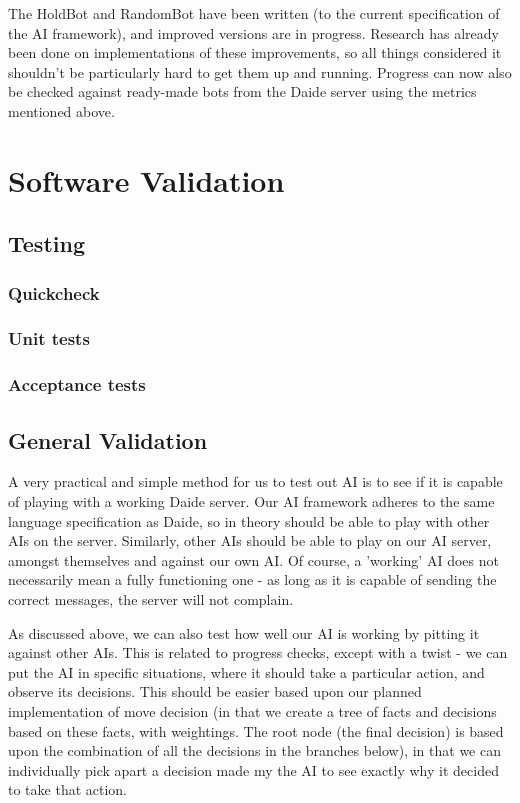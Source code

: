 \documentclass[12pt]{article}
\begin{document}
The HoldBot and RandomBot have been written (to the current specification of the AI framework), and improved versions are in progress. Research has already been done on implementations of these improvements, so all things considered it shouldn't be particularly hard to get them up and running. Progress can now also be checked against ready-made bots from the Daide server using the metrics mentioned above.

\section{Software Validation}
\subsection{Testing}
\subsubsection{Quickcheck}
\subsubsection{Unit tests}
\subsubsection{Acceptance tests}
\subsection{General Validation}
A very practical and simple method for us to test out AI is to see if it is capable of playing with a working Daide server. Our AI framework adheres to the same language specification as Daide, so in theory should be able to play with other AIs on the server. Similarly, other AIs should be able to play on our AI server, amongst themselves and against our own AI. Of course, a 'working' AI does not necessarily mean a fully functioning one - as long as it is capable of sending the correct messages, the server will not complain. 

As discussed above, we can also test how well our AI is working by pitting it against other AIs. This is related to progress checks, except with a twist - we can put the AI in specific situations, where it should take a particular action, and observe its decisions. This should be easier based upon our planned implementation of move decision (in that we create a tree of facts and decisions based on these facts, with weightings. The root node (the final decision) is based upon the combination of all the decisions in the branches below), in that we can individually pick apart a decision made my the AI to see exactly why it decided to take that action.
\end{document}
